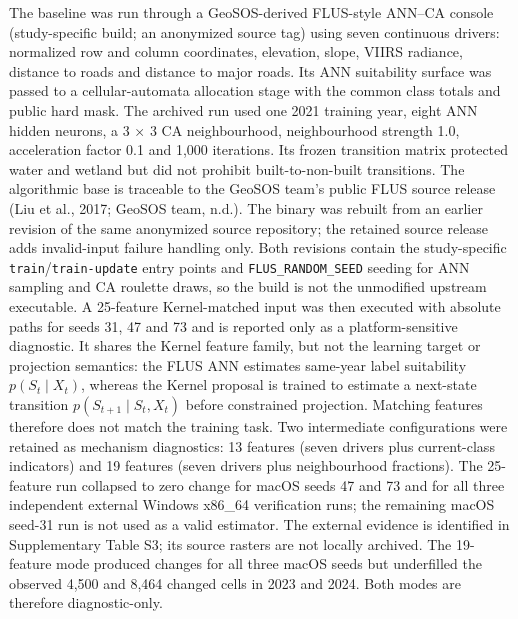 The baseline was run through a GeoSOS-derived FLUS-style ANN--CA console
(study-specific build; an anonymized source tag) using seven continuous
drivers: normalized row and column coordinates, elevation, slope, VIIRS
radiance, distance to roads and distance to major roads. Its ANN
suitability surface was passed to a cellular-automata allocation stage
with the common class totals and public hard mask. The archived run used
one 2021 training year, eight ANN hidden neurons, a 3 × 3 CA
neighbourhood, neighbourhood strength 1.0, acceleration factor 0.1 and
1,000 iterations. Its frozen transition matrix protected water and
wetland but did not prohibit built-to-non-built transitions. The
algorithmic base is traceable to the GeoSOS team's public FLUS source
release (Liu et al., 2017; GeoSOS team, n.d.). The binary was rebuilt
from an earlier revision of the same anonymized source repository; the
retained source release adds invalid-input failure handling only. Both
revisions contain the study-specific
\texttt{train}/\texttt{train-update} entry points and
\texttt{FLUS\_RANDOM\_SEED} seeding for ANN sampling and CA roulette
draws, so the build is not the unmodified upstream executable. A
25-feature Kernel-matched input was then executed with absolute paths
for seeds 31, 47 and 73 and is reported only as a platform-sensitive
diagnostic. It shares the Kernel feature family, but not the learning
target or projection semantics: the FLUS ANN estimates same-year label
suitability \(p(S_t\mid X_t)\), whereas the Kernel proposal is trained
to estimate a next-state transition \(p(S_{t+1}\mid S_t,X_t)\) before
constrained projection. Matching features therefore does not match the
training task. Two intermediate configurations were retained as
mechanism diagnostics: 13 features (seven drivers plus current-class
indicators) and 19 features (seven drivers plus neighbourhood
fractions). The 25-feature run collapsed to zero change for macOS seeds
47 and 73 and for all three independent external Windows x86\_64
verification runs; the remaining macOS seed-31 run is not used as a
valid estimator. The external evidence is identified in Supplementary
Table S3; its source rasters are not locally archived. The 19-feature
mode produced changes for all three macOS seeds but underfilled the
observed 4,500 and 8,464 changed cells in 2023 and 2024. Both modes are
therefore diagnostic-only.

